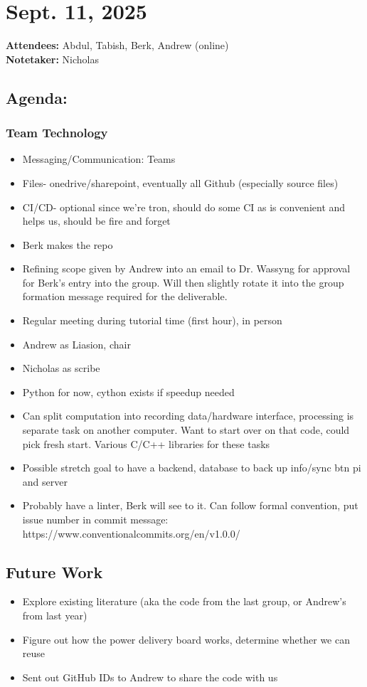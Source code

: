 	\section*{Sept. 11, 2025}

	\textbf{Attendees:} Abdul, Tabish, Berk, Andrew (online) \\
	\textbf{Notetaker:} Nicholas

		\subsection*{Agenda:}
			\subsubsection*{Team Technology}
			\begin{itemize}
				\item Messaging/Communication: Teams 
				\item Files- onedrive/sharepoint, eventually all Github (especially source files)
				\item CI/CD- optional since we’re tron, should do some CI as is convenient and helps us, should be fire and forget
				\item Berk makes the repo
				\item Refining scope given by Andrew into an email to Dr. Wassyng for approval for Berk’s entry into the group. Will then slightly rotate it into the group formation message required for the deliverable.
				\item Regular meeting during tutorial time (first hour), in person
				\item Andrew as Liasion, chair
				\item Nicholas as scribe
				\item Python for now, cython exists if speedup needed
				\item Can split computation into recording data/hardware interface, processing is separate task on another computer. Want to start over on that code, could pick fresh start. Various C/C++ libraries for these tasks
				\item Possible stretch goal to have a backend, database to back up info/sync btn pi and server
				\item Probably have a linter, Berk will see to it. Can follow formal convention, put issue number in commit message: https://www.conventionalcommits.org/en/v1.0.0/
			\end{itemize}
		\subsection*{Future Work}
			\begin{itemize}
				\item Explore existing literature (aka the code from the last group, or Andrew's from last year)
				\item Figure out how the power delivery board works, determine whether we can reuse 
				\item Sent out GitHub IDs to Andrew to share the code with us
			\end{itemize}
